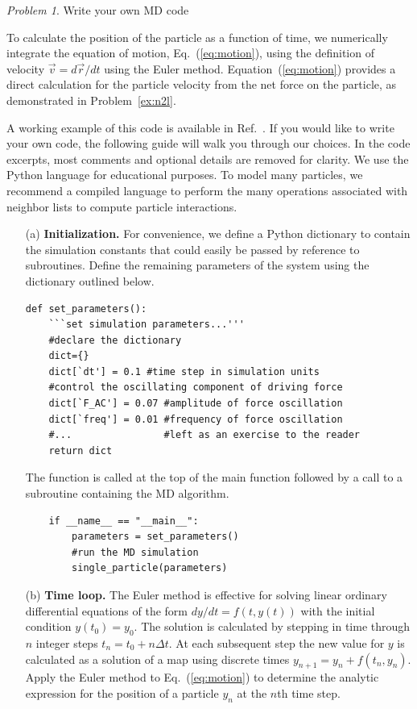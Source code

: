 \documentclass[preprint,showpacs,preprintnumbers,amsmath,amssymb,aps,prb]{revtex4-1}
\theoremstyle{remark}
\newtheorem{problem}{Problem}
\begin{document}
\begin{problem}{Write your own MD code}
  \label{ex:euler}
 
  \noindent To calculate the position of the particle
  as a function of time,
  we
  numerically integrate the equation of motion,
  Eq.~(\ref{eq:motion}),
  using
  the  definition of velocity
  $\vec{v} = d\vec{r}/dt$ 
  using the 
  Euler method.
  Equation~(\ref{eq:motion}) provides
  a direct calculation for the particle velocity
  from the net force on the particle,
  as demonstrated in Problem~\ref{ex:n2l}.

    A working example of this code is available
  in Ref.~.
  If you would like to write your own code,
  the following guide
  will walk you through our choices.
  In the code excerpts,
  most comments and optional details are removed for clarity.
We use the Python 
  language
  for educational purposes.
  To model many particles,
we recommend a   
  compiled  language
  to perform the many operations associated
  with neighbor lists to compute particle interactions.
  
  \begin{enumerate}
    
  \item[(a)] {\bf Initialization.}
    For convenience,
    we define a Python dictionary
    to contain the simulation constants
    that could easily be passed by reference
    to subroutines.
 Define 
    the remaining parameters of the system using the dictionary outlined below.
    \begin{verbatim}
def set_parameters():           
    ```set simulation parameters...'''
    #declare the dictionary     
    dict={}  
    dict[`dt'] = 0.1 #time step in simulation units
    #control the oscillating component of driving force
    dict[`F_AC'] = 0.07 #amplitude of force oscillation
    dict[`freq'] = 0.01 #frequency of force oscillation
    #...                #left as an exercise to the reader
    return dict
    \end{verbatim}

    The function is called at the top of the main function
    followed by a call to a subroutine
    containing the  MD algorithm.
     \begin{verbatim}
    if __name__ == "__main__":
        parameters = set_parameters()
        #run the MD simulation
        single_particle(parameters)
\end{verbatim}

   \item[(b)] {\bf Time loop.}
     The Euler method is effective
     for solving linear ordinary differential  equations
     of the form
     $dy/dt = f(t,y(t))$ with the initial condition $y(t_0) = y_0$.
     The solution is calculated 
     by stepping in time through $n$ integer steps
     $t_n = t_0 + n \Delta t$.
     At each subsequent step the new
     value for $y$ is calculated as a  solution of a map using
     discrete times 
     $y_{n+1} = y_n + f(t_n,y_n)$.
     Apply the Euler method to 
     Eq.~(\ref{eq:motion})
     to determine  the analytic expression
     for the position of a particle
     $y_n$ at the $n$th time step.
  

\end{enumerate}
\end{problem}
\end{document}
